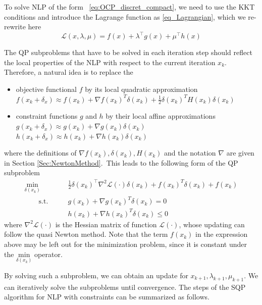 \documentclass  [
  paper    = a4,
  BCOR     = 10mm,
  twoside,
  fontsize = 12pt,
  fleqn,
  toc      = bibnumbered,
  toc      = listofnumbered,
  numbers  = noendperiod,
  headings = normal,
  listof   = leveldown,
  version  = 3.03
]                                       {scrreprt}
\newcommand{\<}{\langle}
\renewcommand{\>}{\rangle}
\begin{document}
To solve NLP of the form  \ref{eq:OCP_discret_compact}, we need to use the KKT conditions and introduce the Lagrange function as \ref{eq_Lagrangian}, which we re-rewrite here 
\begin{equation}
	\mathcal{L}(x,\lambda, \mu) = f(x) + \lambda^\top g(x) +  \mu^\top h(x) 
\end{equation}

The QP subproblems that have to be solved in each iteration step should reflect the local properties of the NLP with respect to the current iteration $x_k$. Therefore, a natural idea is to replace the
\begin{itemize}
	\item objective functional $f$ by its local quadratic approximation\\
	$f(x_k + \delta_x) \approx f(x_k) + \nabla f(x_k)^T\delta(x_k) +\frac{1}{2}\delta(x_k) ^TH(x_k)\delta(x_k) $
	\item constraint functions $g$ and $h$ by their local affine approximations \\
	$g(x_k + \delta_x) \approx  g(x_k) + \nabla g(x_k)\delta(x_k) $ \\
	$h(x_k + \delta_x) \approx  h(x_k) + \nabla h(x_k)\delta(x_k)$
\end{itemize}

where the definitions of $\nabla f(x_k), \delta(x_k) , H(x_k)$ and the notation $\nabla$ are given in Section \ref{Sec:NewtonMethod}. This leads to the following form of the QP subproblem
\begin{subequations}
	\label{eq:ocp_QP}
	\begin{align}
		\underset{\delta(x_k) }{\text{min}} \qquad & \frac{1}{2} \delta(x_k)^\top \nabla^2 \mathcal{L}(\cdot)\delta(x_k) + f(x_k)^T \delta(x_k) + f(x_k)	\\
		\qquad \text{s.t.}\qquad	& g(x_k) + \nabla g(x_k)^T\delta(x_k) = 0 \\
		& h(x_k) + \nabla h(x_k)^T\delta(x_k) \leq 0
	\end{align}
	\label{P4_QP}
\end{subequations}
where $\nabla^2 \mathcal{L}(\cdot)$ is the Hessian matrix of function $\mathcal{L}(\cdot)$, whose updating can follow the quasi Newton method.  Note that the term $f(x_k)$ in the expression above may be left out for the minimization problem, since it is constant under the $\underset{\delta(x_k) }{\text{min}}$  operator.


By solving such a subproblem, we can obtain an update for $x_{k+1}, \lambda_{k+1}, \mu_{k+1}$. We can iteratively solve the subproblems until convergence. The steps of the SQP algorithm for NLP with constraints can be summarized as follows.
\end{document}
